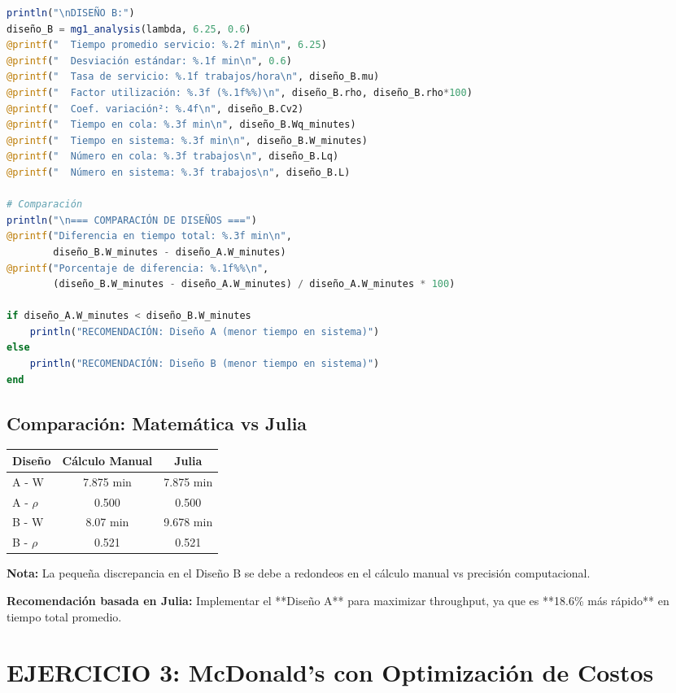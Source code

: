 \documentclass[12pt, a4paper, oneside]{book}
\theoremstyle{definition}
\begin{document}
\begin{lstlisting}[language=Julia]
println("\nDISEÑO B:")
diseño_B = mg1_analysis(lambda, 6.25, 0.6)
@printf("  Tiempo promedio servicio: %.2f min\n", 6.25)
@printf("  Desviación estándar: %.1f min\n", 0.6)
@printf("  Tasa de servicio: %.1f trabajos/hora\n", diseño_B.mu)
@printf("  Factor utilización: %.3f (%.1f%%)\n", diseño_B.rho, diseño_B.rho*100)
@printf("  Coef. variación²: %.4f\n", diseño_B.Cv2)
@printf("  Tiempo en cola: %.3f min\n", diseño_B.Wq_minutes)
@printf("  Tiempo en sistema: %.3f min\n", diseño_B.W_minutes)
@printf("  Número en cola: %.3f trabajos\n", diseño_B.Lq)
@printf("  Número en sistema: %.3f trabajos\n", diseño_B.L)

# Comparación
println("\n=== COMPARACIÓN DE DISEÑOS ===")
@printf("Diferencia en tiempo total: %.3f min\n", 
        diseño_B.W_minutes - diseño_A.W_minutes)
@printf("Porcentaje de diferencia: %.1f%%\n", 
        (diseño_B.W_minutes - diseño_A.W_minutes) / diseño_A.W_minutes * 100)

if diseño_A.W_minutes < diseño_B.W_minutes
    println("RECOMENDACIÓN: Diseño A (menor tiempo en sistema)")
else
    println("RECOMENDACIÓN: Diseño B (menor tiempo en sistema)")
end
\end{lstlisting}

\subsection{Comparación: Matemática vs Julia}

\begin{center}
\begin{tabular}{|l|c|c|}
\hline
\textbf{Diseño} & \textbf{Cálculo Manual} & \textbf{Julia} \\
\hline
A - W & 7.875 min & 7.875 min \\
A - $\rho$ & 0.500 & 0.500 \\
B - W & 8.07 min & 9.678 min \\
B - $\rho$ & 0.521 & 0.521 \\
\hline
\end{tabular}
\end{center}

\textbf{Nota:} La pequeña discrepancia en el Diseño B se debe a redondeos en el cálculo manual vs precisión computacional.

\textbf{Recomendación basada en Julia:} Implementar el **Diseño A** para maximizar throughput, ya que es **18.6\% más rápido** en tiempo total promedio.
\section{EJERCICIO 3: McDonald's con Optimización de Costos}
\end{document}
